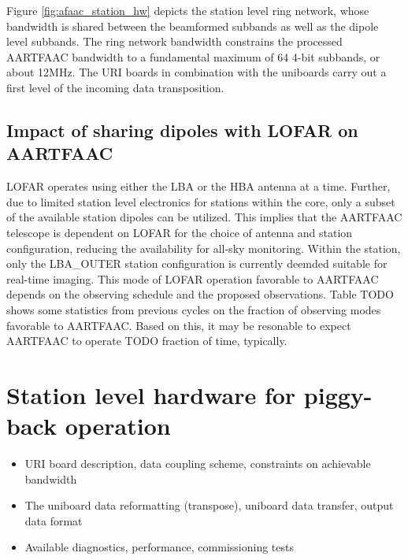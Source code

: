 \documentclass{aa}
\begin{document}
Figure \ref{fig:afaac_station_hw} depicts the  station level ring network, whose
bandwidth is shared between the beamformed  subbands as well as the dipole level
subbands. The ring network bandwidth constrains the processed AARTFAAC bandwidth
to a fundamental maximum of 64 4-bit subbands, or about 12MHz. The URI boards in
combination with  the uniboards  carry out  a first level  of the  incoming data
transposition.


\subsection {\label{subsec:impact_lofar} Impact of sharing dipoles with LOFAR on AARTFAAC}
LOFAR operates using either  the LBA or the HBA antenna at  a time. Further, due
to limited station level electronics for stations within the core, only a subset
of the available station dipoles can be utilized. This implies that the AARTFAAC
telescope  is  dependent  on  LOFAR  for  the  choice  of  antenna  and  station
configuration,  reducing the  availability  for all-sky  monitoring. Within  the
station, only the LBA\_OUTER station configuration is currently deemded suitable
for  real-time imaging.   This mode  of  LOFAR operation  favorable to  AARTFAAC
depends on  the observing  schedule and the  proposed observations.   Table TODO
shows some  statistics from previous cycles  on the fraction of  observing modes
favorable to AARTFAAC. Based on this, it  may be resonable to expect AARTFAAC to
operate TODO fraction of time, typically.

\section {\label{sec:station_hardware} Station level hardware for piggy-back operation}
\begin {itemize}
 \item {URI board  description, data coupling scheme,  constraints on achievable
   bandwidth}
 \item  {The uniboard  data  reformatting (transpose),  uniboard data  transfer,
   output data format}
 \item {Available diagnostics, performance, commissioning tests}
\end{itemize}
\end{document}

